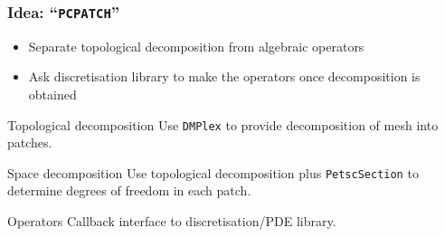\documentclass[presentation,aspectratio=43, 10pt]{beamer}
\begin{document}
\begin{frame}
  \frametitle{Idea: ``\texttt{PCPATCH}''}
  \begin{itemize}
  \item Separate topological decomposition from algebraic operators
  \item Ask discretisation library to make the operators once
    decomposition is obtained
  \end{itemize}
  \pause
  \begin{block}{Topological decomposition}
    Use \texttt{DMPlex} to provide decomposition of mesh into patches.
  \end{block}

  \begin{block}{Space decomposition}
    Use topological decomposition plus \texttt{PetscSection} to
    determine degrees of freedom in each patch.
  \end{block}

  \begin{block}{Operators}
    Callback interface to discretisation/PDE library.
  \end{block}
\end{frame}
\end{document}
